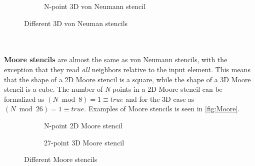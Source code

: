 \begin{figure}[ht]
\begin{subfigure}{.33\textwidth}
{		}
		\caption{N-point 3D von Neumann stencil}
		\label{fig:Np3DNeu}
	\end{subfigure}%
	\caption{Different 3D von Neuman stencils}
	\label{fig:3DvonNeu}
\end{figure}
\\\\
\textbf{Moore stencils} are almost the same as von Neumann stencils, with the exception that  they read \textit{all} neighbors relative to the input element.
This means that the shape of a 2D Moore stencil is a square, while the shape of a 3D Moore stencil is a cube.
The number of \textit{N} points in a 2D Moore stencil can be formalized as $(N\bmod 8)=1\equiv true$ and for the 3D case as $(N\bmod 26)=1\equiv true$.
Examples of Moore stencils is seen in \autoref{fig:Moore}.
\begin{figure}[ht]
	\centering
	\begin{subfigure}{.5\textwidth}
		\centering
		\caption{N-point 2D Moore stencil}
		\label{fig:Np2DMoore}
	\end{subfigure}%
	\begin{subfigure}{.5\textwidth}
		\centering
		\caption{27-point 3D Moore stencil}
		\label{fig:27p3DMoore}
	\end{subfigure}
	\caption{Different Moore stencils}
	\label{fig:Moore}
\end{figure}
